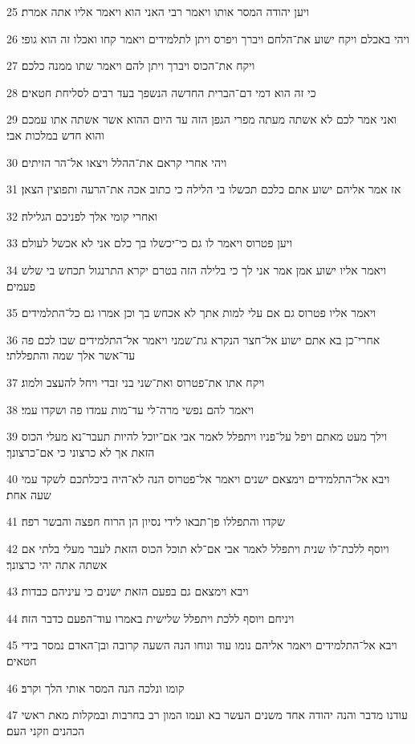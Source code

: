 \par 25 ויען יהודה המסר אותו ויאמר רבי האני הוא ויאמר אליו אתה אמרת׃
\par 26 ויהי באכלם ויקח ישוע את־הלחם ויברך ויפרס ויתן לתלמידים ויאמר קחו ואכלו זה הוא גופי׃
\par 27 ויקח את־הכוס ויברך ויתן להם ויאמר שתו ממנה כלכם׃
\par 28 כי זה הוא דמי דם־הברית החדשה הנשפך בעד רבים לסליחת חטאים׃
\par 29 ואני אמר לכם לא אשתה מעתה מפרי הגפן הזה עד היום ההוא אשר אשתה אתו עמכם והוא חדש במלכות אבי׃
\par 30 ויהי אחרי קראם את־ההלל ויצאו אל־הר הזיתים׃
\par 31 אז אמר אליהם ישוע אתם כלכם תכשלו בי הלילה כי כתוב אכה את־הרעה ותפוצין הצאן׃
\par 32 ואחרי קומי אלך לפניכם הגלילה׃
\par 33 ויען פטרוס ויאמר לו גם כי־יכשלו בך כלם אני לא אכשל לעולם׃
\par 34 ויאמר אליו ישוע אמן אמר אני לך כי בלילה הזה בטרם יקרא התרנגול תכחש בי שלש פעמים׃
\par 35 ויאמר אליו פטרוס גם אם עלי למות אתך לא אכחש בך וכן אמרו גם כל־התלמידים׃
\par 36 אחרי־כן בא אתם ישוע אל־חצר הנקרא גת־שמני ויאמר אל־התלמידים שבו לכם פה עד־אשר אלך שמה והתפללתי׃
\par 37 ויקח אתו את־פטרוס ואת־שני בני זבדי ויחל להעצב ולמוג׃
\par 38 ויאמר להם נפשי מרה־לי עד־מות עמדו פה ושקדו עמי׃
\par 39 וילך מעט מאתם ויפל על־פניו ויתפלל לאמר אבי אם־יוכל להיות תעבר־נא מעלי הכוס הזאת אך לא כרצוני כי אם־כרצונך׃
\par 40 ויבא אל־התלמידים וימצאם ישנים ויאמר אל־פטרוס הנה לא־היה ביכלתכם לשקד עמי שעה אחת׃
\par 41 שקדו והתפללו פן־תבאו לידי נסיון הן הרוח חפצה והבשר רפה׃
\par 42 ויוסף ללכת־לו שנית ויתפלל לאמר אבי אם־לא תוכל הכוס הזאת לעבר מעלי בלתי אם אשתה אתה יהי כרצונך׃
\par 43 ויבא וימצאם גם בפעם הזאת ישנים כי עיניהם כבדות׃
\par 44 ויניחם ויוסף ללכת ויתפלל שלישית באמרו עוד־הפעם כדבר הזה׃
\par 45 ויבא אל־התלמידים ויאמר אליהם נומו עוד ונוחו הנה השעה קרובה ובן־האדם נמסר בידי חטאים׃
\par 46 קומו ונלכה הנה המסר אותי הלך וקרב׃
\par 47 עודנו מדבר והנה יהודה אחד משנים העשר בא ועמו המון רב בחרבות ובמקלות מאת ראשי הכהנים וזקני העם׃

